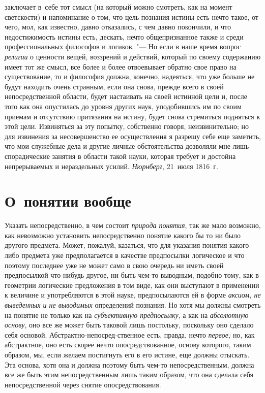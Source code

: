 заключает в~себе тот смысл (на который можно смотреть, как на момент
светскости) и напоминание о том, что цель познания истины есть нечто такое,
от чего, мол, как известно, давно отказались, с чем давно покончили, и
что недостижимость истины есть, дескать, нечто
общепризнанное также и среди профессиональных философов и логиков. "---
Но если в наше время вопрос {\em религии} о ценности
вещей, воззрений и действий, который по своему содержанию имеет тот же
смысл, все более и более отвоевывает обратно свое право на существование,
то и философия должна, конечно, надеяться, что уже больше не будут находить
очень странным, если она снова, прежде всего в своей непосредственной
области, будет настаивать на своей истинной цели и, после того как она
опустилась до уровня других наук, уподобившись им по своим приемам и
отсутствию притязания на истину, будет снова стремиться подняться к этой
цели. Извиняться за эту попытку, собственно говоря, неизвинительно; но для
извинения за несовершенство ее осуществления я разрешу себе еще заметить,
что мои служебные дела и другие личные обстоятельства дозволяли мне лишь
спорадические занятия в области такой науки, которая требует и достойна
непрерываемых и нераздельных усилий.
{\em Нюрнберг}, 21~июля 1816~г.

\clearpage

\chapter[О~понятии вообще]{О~понятии вообще}

Указать непосредственно, в чем состоит {\em природа понятия},
так же мало возможно, как невозможно установить
непосредственно понятие какого бы то ни было другого предмета. Может,
пожалуй, казаться, что для указания понятия какого-либо предмета уже
предполагается в качестве предпосылки логическое и что поэтому последнее
уже не может само в свою очередь ни иметь своей предпосылкой что-нибудь
другое, ни быть чем-то выводным, подобно тому, как в геометрии логические
предложения в том виде, как они выступают в применении к величине и
употребляются в этой науке, предпосылаются ей в форме
{\em аксиом, не выведенных и не выводимых} определений познания.
Но хотя мы должны смотреть на понятие не только как на {\em субъективную
предпосылку}, а как на {\em абсолютную основу}, оно все же может быть
таковой лишь постольку, поскольку оно сделало себя основой.
Абстрактно-непосред-ственное есть, правда, нечто {\em первое;} но, как
абстрактное, оно есть скорее нечто опосредствованное, основу которого,
таким образом, мы, если желаем постигнуть его в его истине, еще должны
отыскать. Эта основа, хотя она и должна поэтому быть чем-то
непосредственным, должна все же быть этим непосредственным лишь таким
образом, что она сделала себя непосредственной через снятие
опосредствования.

